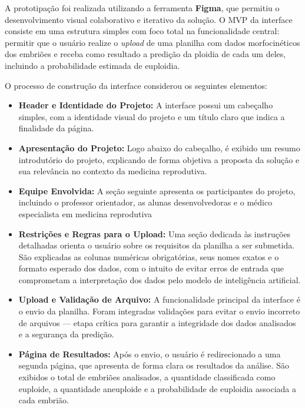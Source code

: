 A prototipação foi realizada utilizando a ferramenta \textbf{Figma}, que permitiu o desenvolvimento visual colaborativo e iterativo da solução. O MVP da interface consiste em uma estrutura simples com foco total na funcionalidade central: permitir que o usuário realize o \textit{upload} de uma planilha com dados morfocinéticos dos embriões e receba como resultado a predição da ploidia de cada um deles, incluindo a probabilidade estimada de euploidia.

O processo de construção da interface considerou os seguintes elementos:
\begin{itemize}
    \item \textbf{Header e Identidade do Projeto:} A interface possui um cabeçalho simples, com a identidade visual do projeto e um título claro que indica a finalidade da página.

    \item \textbf{Apresentação do Projeto:} Logo abaixo do cabeçalho, é exibido um resumo introdutório do projeto, explicando de forma objetiva a proposta da solução e sua relevância no contexto da medicina reprodutiva.

    \item \textbf{Equipe Envolvida:} A seção seguinte apresenta os participantes do projeto, incluindo o professor orientador, as alunas desenvolvedoras e o médico especialista em medicina reprodutiva

    \item \textbf{Restrições e Regras para o Upload:} Uma seção dedicada às instruções detalhadas orienta o usuário sobre os requisitos da planilha a ser submetida. São explicadas as colunas numéricas obrigatórias, seus nomes exatos e o formato esperado dos dados, com o intuito de evitar erros de entrada que comprometam a interpretação dos dados pelo modelo de inteligência artificial.

    \item \textbf{Upload e Validação de Arquivo:} A funcionalidade principal da interface é o envio da planilha. Foram integradas validações para evitar o envio incorreto de arquivos — etapa crítica para garantir a integridade dos dados analisados e a segurança da predição.

    \item \textbf{Página de Resultados:} Após o envio, o usuário é redirecionado a uma segunda página, que apresenta de forma clara os resultados da análise. São exibidos o total de embriões analisados, a quantidade classificada como euploide, a quantidade aneuploide e a probabilidade de euploidia associada a cada embrião.

\end{itemize}

